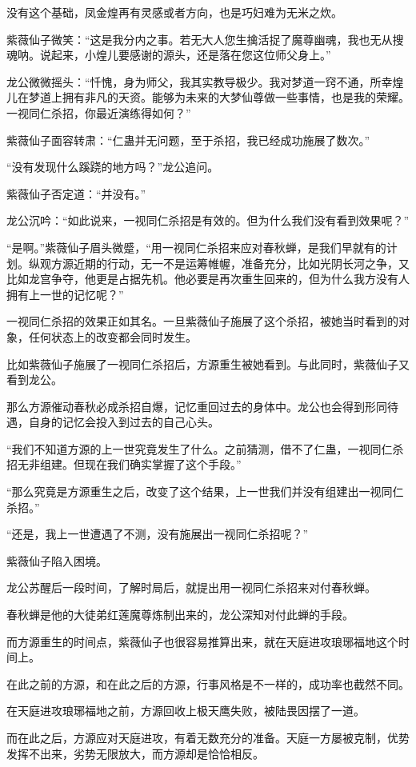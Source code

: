 \begin{this_body}
没有这个基础，凤金煌再有灵感或者方向，也是巧妇难为无米之炊。

紫薇仙子微笑：“这是我分内之事。若无大人您生擒活捉了魔尊幽魂，我也无从搜魂呐。说起来，小煌儿要感谢的源头，还是落在您这位师父身上。”

龙公微微摇头：“忏愧，身为师父，我其实教导极少。我对梦道一窍不通，所幸煌儿在梦道上拥有非凡的天资。能够为未来的大梦仙尊做一些事情，也是我的荣耀。一视同仁杀招，你最近演练得如何？”

紫薇仙子面容转肃：“仁蛊并无问题，至于杀招，我已经成功施展了数次。”

“没有发现什么蹊跷的地方吗？”龙公追问。

紫薇仙子否定道：“并没有。”

龙公沉吟：“如此说来，一视同仁杀招是有效的。但为什么我们没有看到效果呢？”

“是啊。”紫薇仙子眉头微蹙，“用一视同仁杀招来应对春秋蝉，是我们早就有的计划。纵观方源近期的行动，无一不是运筹帷幄，准备充分，比如光阴长河之争，又比如龙宫争夺，他更是占据先机。他必要是再次重生回来的，但为什么我方没有人拥有上一世的记忆呢？”

一视同仁杀招的效果正如其名。一旦紫薇仙子施展了这个杀招，被她当时看到的对象，任何状态上的改变都会同时发生。

比如紫薇仙子施展了一视同仁杀招后，方源重生被她看到。与此同时，紫薇仙子又看到龙公。

那么方源催动春秋必成杀招自爆，记忆重回过去的身体中。龙公也会得到形同待遇，自身的记忆会投入到过去的自己心头。

“我们不知道方源的上一世究竟发生了什么。之前猜测，借不了仁蛊，一视同仁杀招无非组建。但现在我们确实掌握了这个手段。”

“那么究竟是方源重生之后，改变了这个结果，上一世我们并没有组建出一视同仁杀招。”

“还是，我上一世遭遇了不测，没有施展出一视同仁杀招呢？”

紫薇仙子陷入困境。

龙公苏醒后一段时间，了解时局后，就提出用一视同仁杀招来对付春秋蝉。

春秋蝉是他的大徒弟红莲魔尊炼制出来的，龙公深知对付此蝉的手段。

而方源重生的时间点，紫薇仙子也很容易推算出来，就在天庭进攻琅琊福地这个时间上。

在此之前的方源，和在此之后的方源，行事风格是不一样的，成功率也截然不同。

在天庭进攻琅琊福地之前，方源回收上极天鹰失败，被陆畏因摆了一道。

而在此之后，方源应对天庭进攻，有着无数充分的准备。天庭一方屡被克制，优势发挥不出来，劣势无限放大，而方源却是恰恰相反。


\end{this_body}
